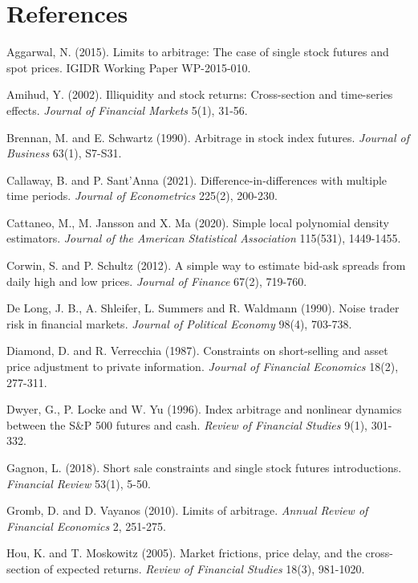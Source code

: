 \chapter*{References}
\small
\begin{description}[leftmargin=1.2em,itemsep=1pt,font=\normalfont]
\item Aggarwal, N. (2015). Limits to arbitrage: The case of single stock futures and spot prices. IGIDR Working Paper WP-2015-010.
\item Amihud, Y. (2002). Illiquidity and stock returns: Cross-section and time-series effects. \emph{Journal of Financial Markets} 5(1), 31-56.
\item Brennan, M. and E. Schwartz (1990). Arbitrage in stock index futures. \emph{Journal of Business} 63(1), S7-S31.
\item Callaway, B. and P. Sant'Anna (2021). Difference-in-differences with multiple time periods. \emph{Journal of Econometrics} 225(2), 200-230.
\item Cattaneo, M., M. Jansson and X. Ma (2020). Simple local polynomial density estimators. \emph{Journal of the American Statistical Association} 115(531), 1449-1455.
\item Corwin, S. and P. Schultz (2012). A simple way to estimate bid-ask spreads from daily high and low prices. \emph{Journal of Finance} 67(2), 719-760.
\item De Long, J. B., A. Shleifer, L. Summers and R. Waldmann (1990). Noise trader risk in financial markets. \emph{Journal of Political Economy} 98(4), 703-738.
\item Diamond, D. and R. Verrecchia (1987). Constraints on short-selling and asset price adjustment to private information. \emph{Journal of Financial Economics} 18(2), 277-311.
\item Dwyer, G., P. Locke and W. Yu (1996). Index arbitrage and nonlinear dynamics between the S\&P 500 futures and cash. \emph{Review of Financial Studies} 9(1), 301-332.
\item Gagnon, L. (2018). Short sale constraints and single stock futures introductions. \emph{Financial Review} 53(1), 5-50.
\item Gromb, D. and D. Vayanos (2010). Limits of arbitrage. \emph{Annual Review of Financial Economics} 2, 251-275.
\item Hou, K. and T. Moskowitz (2005). Market frictions, price delay, and the cross-section of expected returns. \emph{Review of Financial Studies} 18(3), 981-1020.

\end{description}
